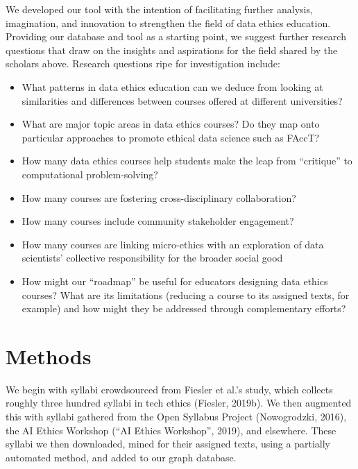 \documentclass[
]{article}
\providecommand{\tightlist}{%
  \setlength{\itemsep}{0pt}\setlength{\parskip}{0pt}}
\begin{document}
We developed our tool with the intention of facilitating further
analysis, imagination, and innovation to strengthen the field of data
ethics education. Providing our database and tool as a starting point,
we suggest further research questions that draw on the insights and
aspirations for the field shared by the scholars above. Research
questions ripe for investigation include:

\begin{itemize}
\tightlist
\item
  What patterns in data ethics education can we deduce from looking at
  similarities and differences between courses offered at different
  universities?
\item
  What are major topic areas in data ethics courses? Do they map onto
  particular approaches to promote ethical data science such as FAccT?
\item
  How many data ethics courses help students make the leap from
  ``critique'' to computational problem-solving?
\item
  How many courses are fostering cross-disciplinary collaboration?
\item
  How many courses include community stakeholder engagement?
\item
  How many courses are linking micro-ethics with an exploration of data
  scientists' collective responsibility for the broader social good
\item
  How might our ``roadmap'' be useful for educators designing data
  ethics courses? What are its limitations (reducing a course to its
  assigned texts, for example) and how might they be addressed through
  complementary efforts?
\end{itemize}

\hypertarget{methods}{%
\section{Methods}\label{methods}}

We begin with syllabi crowdsourced from Fiesler et al.'s study, which
collects roughly three hundred syllabi in tech ethics (Fiesler, 2019b).
We then augmented this with syllabi gathered from the Open Syllabus
Project (Nowogrodzki, 2016), the AI Ethics Workshop ({``{AI} {Ethics}
{Workshop}''}, 2019), and elsewhere. These syllabi we then downloaded,
mined for their assigned texts, using a partially automated method, and
added to our graph database.
\end{document}
